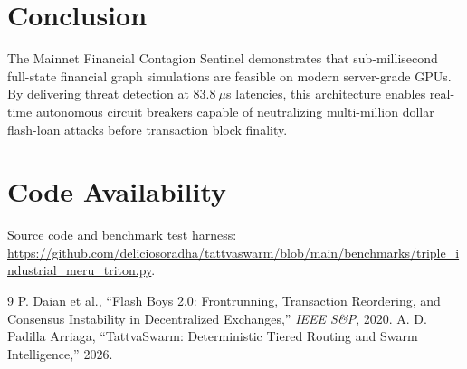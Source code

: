 \documentclass[10pt,twocolumn]{article}
\begin{document}
\section{Conclusion}
The Mainnet Financial Contagion Sentinel demonstrates that sub-millisecond full-state financial graph simulations are feasible on modern server-grade GPUs. By delivering threat detection at $83.8~\mu$s latencies, this architecture enables real-time autonomous circuit breakers capable of neutralizing multi-million dollar flash-loan attacks before transaction block finality.

\section*{Code Availability}
Source code and benchmark test harness: \url{https://github.com/deliciosoradha/tattvaswarm/blob/main/benchmarks/triple_industrial_meru_triton.py}.

\begin{thebibliography}{9}
P. Daian et al., ``Flash Boys 2.0: Frontrunning, Transaction Reordering, and Consensus Instability in Decentralized Exchanges,'' \textit{IEEE S\&P}, 2020.
A. D. Padilla Arriaga, ``TattvaSwarm: Deterministic Tiered Routing and Swarm Intelligence,'' 2026.
\end{thebibliography}
\end{document}
